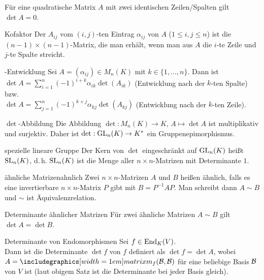 \begin{Kor}
    Für eine quadratische Matrix $A$ mit zwei identischen Zeilen/Spalten gilt
    $\det A = 0$.
\end{Kor}

\begin{Def}{Kofaktor}
    Der  $A_{ij}$ vom $(i, j)$-ten Eintrag $\alpha_{ij}$ von
    $A$ ($1 \le i, j \le n$) ist die $(n-1) \times (n-1)$-Matrix,
    die man erhält, wenn man aus $A$ die $i$-te Zeile und $j$-te Spalte
    streicht.
\end{Def}

\begin{Satz}{-Entwicklung}
    Sei $A = (\alpha_{ij}) \in M_n(K)$ mit
    $k \in \{1, \ldots, n\}$.
    Dann ist \\
    $\det A = \sum_{i=1}^n (-1)^{i+k} \alpha_{ik} \det(A_{ik})$
    (Entwicklung nach der $k$-ten Spalte) bzw. \\
    $\det A = \sum_{j=1}^n (-1)^{k+j} \alpha_{kj} \det(A_{kj})$
    (Entwicklung nach der $k$-ten Zeile).
\end{Satz}

\begin{Satz}{$\det$-Abbildung}
    Die Abbildung $\det: M_n(K) \rightarrow K$, $A \mapsto \det A$
    ist multiplikativ und surjektiv.
    Daher ist $\det: \operatorname{GL}_n(K) \rightarrow K^\ast$ ein Gruppenepimorphismus.
\end{Satz}

\begin{Def}{spezielle lineare Gruppe}
    Der Kern von $\det$ eingeschränkt auf $\operatorname{GL}_n(K)$ heißt
     $\operatorname{SL}_n(K)$, d.\,h. $\operatorname{SL}_n(K)$ ist die
    Menge aller $n \times n$-Matrizen mit Determinante $1$.
\end{Def}

\begin{xDef}{ähnliche Matrizen}{ahnlich}
    Zwei $n \times n$-Matrizen $A$ und $B$ heißen ähnlich, falls es eine
    invertierbare $n \times n$-Matrix $P$ gibt mit $B = P^{-1} A P$.
    Man schreibt dann $A \sim B$ und $\sim$ ist Äquivalenzrelation.
\end{xDef}

\begin{Satz}{Determinante ähnlicher Matrizen}
    Für zwei ähnliche Matrizen $A \sim B$ gilt $\det A = \det B$.
\end{Satz}

\begin{Def}{Determinante von Endomorphismen}
    Sei $f \in \operatorname{End}_K(V)$. \\
    Dann ist die Determinante $\det f$ von $f$ definiert als $\det f = \det A$,
    wobei $A = \hommatrix{f}{B}{B}$ für eine beliebige Basis $\mathcal{B}$ von
    $V$ ist (laut obigem Satz ist die Determinante bei jeder Basis gleich).
\end{Def}

